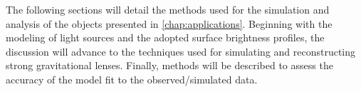 The following sections will detail the methods used for the simulation and analysis of the objects presented in \cref{chap:applications}. Beginning with the modeling of light sources and the adopted surface brightness profiles, the discussion will advance to the techniques used for simulating and reconstructing strong gravitational lenses. Finally, methods will be described to assess the accuracy of the model fit to the observed/simulated data.




